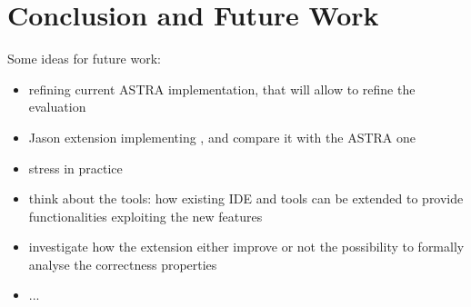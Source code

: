 \section{Conclusion and Future Work}
\label{sec:conclusion}


Some ideas for future work:

\begin{itemize}
\item refining current ASTRA implementation, that will allow to refine the evaluation
\item Jason extension implementing {\aser}, and compare it with the ASTRA one
\item stress {\aser} in practice 
\item think about the tools: how existing IDE and tools can be extended to provide functionalities exploiting the new features
\item investigate how the extension either improve or not the possibility to formally analyse the correctness properties
\item ...
\end{itemize}
